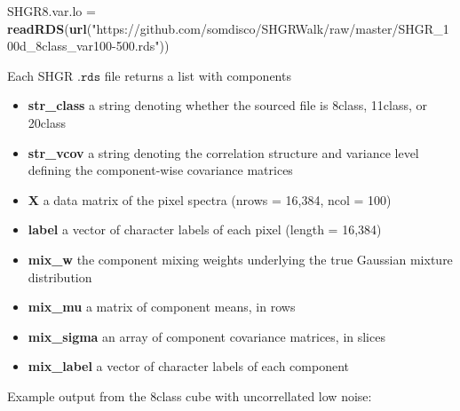 \documentclass[]{article}
\newenvironment{Shaded}{\begin{snugshade}}{\end{snugshade}}
\newcommand{\CommentTok}[1]{\textcolor[rgb]{0.56,0.35,0.01}{\textit{#1}}}
\newcommand{\KeywordTok}[1]{\textcolor[rgb]{0.13,0.29,0.53}{\textbf{#1}}}
\newcommand{\NormalTok}[1]{#1}
\newcommand{\StringTok}[1]{\textcolor[rgb]{0.31,0.60,0.02}{#1}}
\providecommand{\tightlist}{%
  \setlength{\itemsep}{0pt}\setlength{\parskip}{0pt}}
\begin{document}
\begin{Shaded}
\begin{Highlighting}[]
\NormalTok{SHGR8.var.lo =}\StringTok{ }\KeywordTok{readRDS}\NormalTok{(}\KeywordTok{url}\NormalTok{(}\StringTok{"https://github.com/somdisco/SHGRWalk/raw/master/SHGR_100d_8class_var100-500.rds"}\NormalTok{))}
\end{Highlighting}
\end{Shaded}

Each SHGR \(\texttt{.rds}\) file returns a list with components

\begin{itemize}
\tightlist
\item
  \textbf{str\_class} a string denoting whether the sourced file is 8class, 11class, or 20class
\item
  \textbf{str\_vcov} a string denoting the correlation structure and variance level defining the component-wise covariance matrices
\item
  \textbf{X} a data matrix of the pixel spectra (nrows = 16,384, ncol = 100)
\item
  \textbf{label} a vector of character labels of each pixel (length = 16,384)
\item
  \textbf{mix\_w} the component mixing weights underlying the true Gaussian mixture distribution
\item
  \textbf{mix\_mu} a matrix of component means, in rows
\item
  \textbf{mix\_sigma} an array of component covariance matrices, in slices
\item
  \textbf{mix\_label} a vector of character labels of each component
\end{itemize}

Example output from the 8class cube with uncorrellated low noise:

\begin{Shaded}
\end{Shaded}
\end{document}
